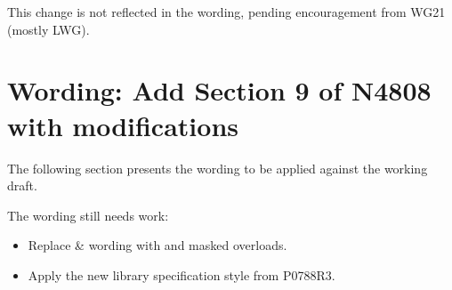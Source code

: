 This change is not reflected in the wording, pending encouragement from WG21 (mostly LWG).

\section{Wording: Add Section 9 of N4808 with modifications}\label{sec:wording}

The following section presents the wording to be applied against the \CC{}
working draft.

The wording still needs work:
\begin{itemize}
  \item Replace  \&  wording with  and masked overloads.
  \item Apply the new library specification style from P0788R3.
\end{itemize}

\begin{wgText}
  \setcounter{WGClause}{28}
  \setcounter{WGSubSection}{8}
  
\end{wgText}



